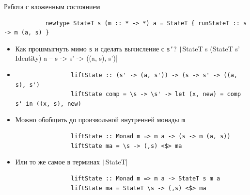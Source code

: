     \begin{frame}[fragile]{Работа с вложенным состоянием}
        \begin{verbatim}
            newtype StateT s (m :: * -> *) a = StateT { runStateT :: s -> m (a, s) }
        \end{verbatim}
        \begin{itemize}
            \item[\todo] Как прошмыгнуть мимо \texttt{s} и сделать вычисление с \texttt{s'}?
            \texttt|StateT s (StateT s' Identity) a -- s -> s' -> ((a, s), s')|
            \item[\answer] \pause
            \begin{verbatim}
                liftState :: (s' -> (a, s')) -> (s -> s' -> ((a, s), s')
                liftState comp = \s -> \s' -> let (x, new) = comp s' in ((x, s), new)
            \end{verbatim}
            \item Можно обобщить до произвольной внутренней монады \texttt{m}
            \begin{verbatim}
                liftState :: Monad m => m a -> (s -> m (a, s))
                liftState ma = \s -> (,s) <$> ma
            \end{verbatim}
            \item Или то же самое в терминах \texttt|StateT|
            \begin{verbatim}
                liftState :: Monad m => m a -> StateT s m a
                liftState ma = StateT \s -> (,s) <$> ma
            \end{verbatim}
        \end{itemize}
    \end{frame}

